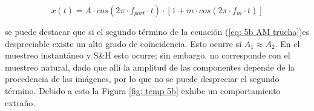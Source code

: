\begin{equation}
    x(t) = A \cdot cos(2\pi\cdot  f_{port} \cdot  t) \cdot [ 1+ m \cdot cos(2\pi \cdot f_{m} \cdot t )]
\end{equation}

\noindent se puede destacar que si el segundo término de la ecuación (\ref{eq: 5b AM trucha})es despreciable existe un alto grado de coincidencia. Esto ocurre si $A_1 \approx A_2$. En el muestreo instantáneo y S\&H esto ocurre; sin embargo, no corresponde con el muestreo natural, dado que allí la amplitud de las componentes depende de la procedencia de las imágenes, por lo que no se puede despreciar el segundo término. Debido a esto la Figura \ref{fig: temp 5b} exhibe un comportamiento extraño.


